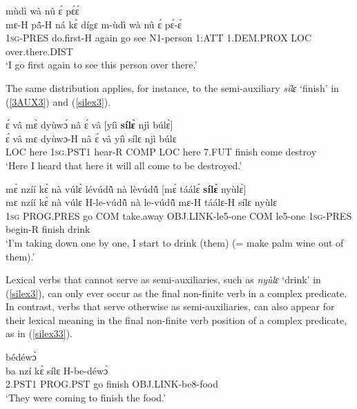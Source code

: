 \begin{exe} 
\ex\label{ke6}
   mùdì wà nû ɛ́ pɛ́ɛ́ \\
        mɛ-H pã̂-H ná kɛ̀ dígɛ m-ùdì wà nû ɛ́ pɛ́-ɛ́ \\
        1\textsc{sg}-PRES do.first-H again go see N1-person 1:ATT 1.DEM.PROX LOC over.there.DIST \\
    \trans `I go first again to see this person over there.'
\end{exe}

\noindent The same distribution applies, for instance, to the semi-auxiliary {\itshape sílɛ} `finish' in (\ref{3AUX3}) and (\ref{silex3}).

\begin{exe} 
\ex\label{3AUX3}
  \glll  ɛ́ vâ mɛ̀ dyùwɔ́ nâ ɛ́ vâ [yíì {\bfseries sílɛ̀} njì búlɛ̀] \\
        ɛ́ vâ mɛ dyùwɔ-H nâ ɛ́ vâ yíì sílɛ njì búlɛ \\
         LOC here 1\textsc{sg}.PST1 hear-R COMP LOC here 7.FUT finish come destroy  \\
    \trans `Here I heard that here it will all come to be destroyed.'
\end{exe}

\begin{exe} 
\ex\label{silex3}
  \glll   mɛ̀ nzíí kɛ̀ nà vúlɛ̀ lévúdũ̂ nà lèvúdũ̂ [mɛ́ táálɛ́ {\bfseries sílɛ̀} nyùlɛ̀] \\
          mɛ nzíí kɛ̀ nà vúlɛ H-le-vúdũ̂ nà le-vúdũ̂ mɛ-H táálɛ-H sílɛ nyùlɛ \\
           1\textsc{sg} PROG.PRES go COM take.away OBJ.LINK-le5-one COM le5-one 1\textsc{sg}-PRES begin-R finish drink \\
    \trans `I'm taking down one by one, I start to drink (them) (= make palm wine out of them).'
\end{exe}

\noindent Lexical verbs that cannot serve as semi-auxiliaries, such as {\itshape nyùlɛ} `drink' in (\ref{silex3}), can only ever occur as the final non-finite verb in a complex predicate. In contrast, verbs that serve otherwise as semi-auxiliaries, can also appear for their lexical meaning in the final non-finite verb position of a complex predicate, as in (\ref{silex33}).

\begin{exe} 
\ex\label{silex33}
   bédéwɔ̀ \\
          ba nzí kɛ̀ sílɛ H-be-déwɔ̀ \\
        2.PST1 PROG.PST go finish OBJ.LINK-be8-food \\
    \trans `They were coming to finish the food.'
\end{exe}

















